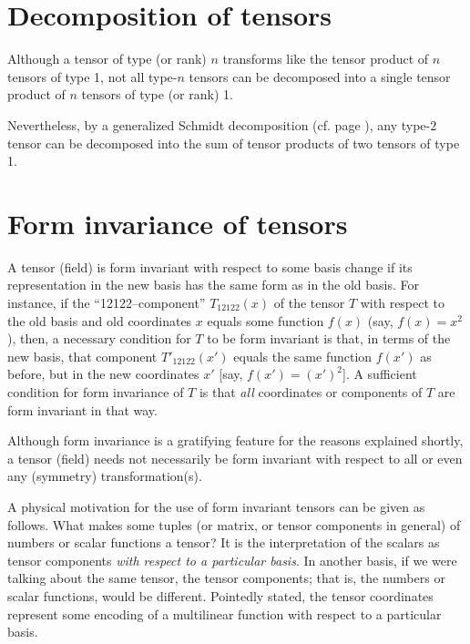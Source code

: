 \section{Decomposition of tensors}

Although a tensor of type (or rank) $n$ transforms like the tensor product of $n$ tensors of type 1,
not all type-$n$ tensors can be decomposed into a single
tensor product of $n$ tensors of type (or rank) 1.

Nevertheless,
by a generalized Schmidt decomposition (cf. page \pageref{2011-m-Schmidtdecomposition}),
any type-$2$ tensor  can be decomposed into
the sum of
tensor products of two tensors of type 1.

\section{Form invariance of tensors}

A tensor (field) is
form invariant  with respect to some basis change
if its representation in the new basis has the same form as in the old basis.
For instance, if the ``12122--component'' $T_{12122} (x)$ of the tensor $T$
with respect to the old basis and old coordinates $x$   equals some function $f(x)$ (say, $f(x)=x^2$),
then, a necessary condition for $T$ to be form invariant is that, in terms of the new basis,
that component  $T'_{12122} (x')$  equals the same function $f(x')$ as before, but in the new coordinates $x'$
[say, $f(x')=(x')^2$].
A sufficient condition for form invariance of $T$ is that {\em all}
coordinates or components of $T$ are form invariant in that way.


Although form invariance is a gratifying feature for the reasons explained shortly,
a tensor (field) needs not necessarily
be form invariant with respect to all or even any (symmetry) transformation(s).



A physical motivation for the use of form invariant tensors can be given as follows.
What makes some tuples (or matrix, or tensor components in general)  of
numbers or scalar functions a tensor? It is the
interpretation of the scalars as tensor components {\em with respect to
a particular basis}. In another basis, if we were talking about the same
tensor, the tensor components; that is, the numbers or scalar functions,
would be different.
Pointedly stated, the tensor coordinates represent some
encoding of a multilinear function with respect to a particular basis.

